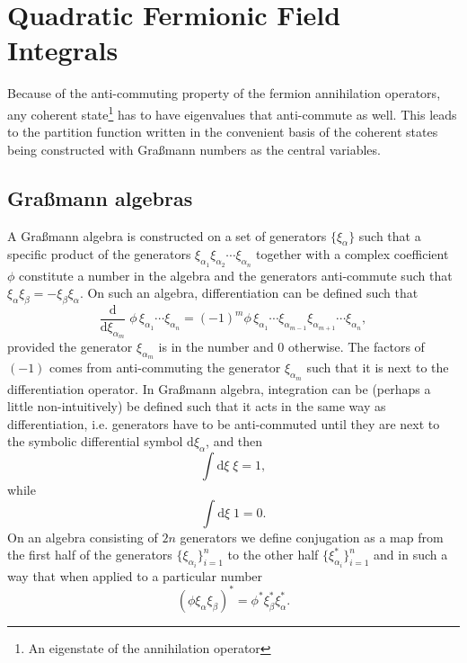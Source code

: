 \section{Quadratic Fermionic Field Integrals}

Because of the anti-commuting property of the fermion annihilation operators, any coherent state\footnote{An eigenstate
of the annihilation operator} has to have eigenvalues that anti-commute as well. This leads to the partition function
written in the convenient basis of the coherent states being constructed with Gra\ss mann numbers as the central
variables.

\subsection{Gra\ss mann algebras}
A Gra\ss mann algebra is constructed on a set of generators $\{\xi_\alpha\}$ such that a specific product
of the generators $\xi_{\alpha_1}\xi_{\alpha_2}\cdots\xi_{\alpha_n}$ together with a complex coefficient $\phi$ constitute a
number in the algebra and the generators anti-commute such that $\xi_\alpha\xi_\beta = -\xi_\beta\xi_\alpha$. On such
an algebra, differentiation can be defined such that
\begin{equation}
    \label{eq:Field:Ferm:Grass:diff}
    \frac{\mathrm{d}}{\mathrm{d}\xi_{\alpha_m}}\;\phi\,\xi_{\alpha_1}\cdots\xi_{\alpha_n} = (-1)^m\phi\,\xi_{\alpha_1}\cdots\xi_{\alpha_{m-1}}\xi_{\alpha_{m+1}}\cdots\xi_{\alpha_n},
\end{equation}
provided the generator $\xi_{\alpha_m}$ is in the number and $0$ otherwise. The factors of $(-1)$ comes from anti-commuting
the generator $\xi_{\alpha_m}$ such that it is next to the differentiation operator. In Gra\ss mann algebra, integration
can be (perhaps a little non-intuitively) be defined such that it acts in the same way as differentiation, i.e. generators
have to be anti-commuted until they are next to the symbolic differential symbol $\mathrm{d}\xi_{\alpha}$, and then
\begin{equation}
    \label{eq:Field:Ferm:Grass:int}
    \int\!\mathrm{d}\xi\;\xi = 1,
\end{equation}
while
\begin{equation}
    \label{eq:Field:Ferm:Grass:int2}
    \int\!\mathrm{d}\xi\;1 = 0.
\end{equation}
On an algebra consisting of $2n$ generators we define conjugation as a map from the first half of the generators $\{\xi_{\alpha_i}\}_{i=1}^n$
to the other half $\{\xi_{\alpha_i}^\ast\}_{i=1}^n$ and in such a way that when applied to a particular number
\begin{equation}
    \label{eq:Field:Ferm:Grass:conj}
    (\phi\xi_\alpha\xi_\beta)^\ast = \phi^\ast\xi_\beta^\ast\xi_\alpha^\ast.
\end{equation}

